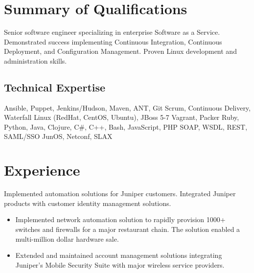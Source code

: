 \documentclass[12pt,letter,roman]{moderncv}
\begin{document}
\makecvtitle

\section{Summary of Qualifications}

Senior software engineer specializing in enterprise Software as a
Service. Demonstrated success implementing Continuous Integration, Continuous
Deployment, and Configuration Management.  Proven Linux development
and administration skills.

\subsection{Technical Expertise}

 { Ansible, Puppet, Jenkins/Hudson,
  Maven, ANT, Git }
 { Scrum, Continuous Delivery, Waterfall }
 { Linux (RedHat, CentOS, Ubuntu), JBoss 5-7 }
 { Vagrant, Packer }
 { Ruby, Python, Java, Clojure, C\#, C++, Bash, JavaScript, PHP }
 { SOAP, WSDL, REST, SAML/SSO }
 { JunOS, Netconf, SLAX }

\section{Experience}


Implemented automation solutions for Juniper customers. Integrated
Juniper products with customer identity management solutions.

\begin{itemize}
  \item Implemented network automation solution to rapidly provision
    1000+ switches and firewalls for a major restaurant chain.  The
    solution enabled a multi-million dollar hardware sale.

  \item Extended and maintained account management solutions
    integrating Juniper's Mobile Security Suite with major wireless
    service providers.

\end{itemize}

\end{document}
